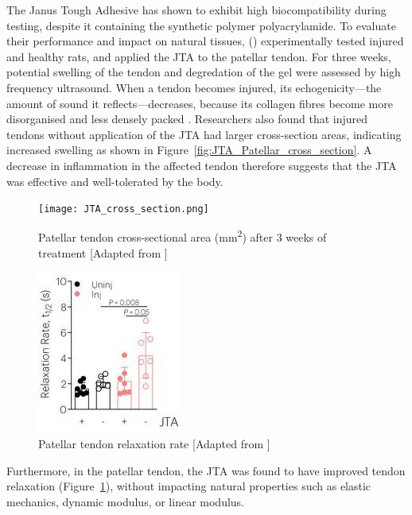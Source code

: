 The Janus Tough Adhesive has shown to exhibit high biocompatibility during testing, despite it containing the synthetic polymer polyacrylamide. To evaluate their performance and impact on natural tissues, \citeauthor{freedmanEnhancedTendonHealing2022} (\citeyear{freedmanEnhancedTendonHealing2022}) experimentally tested  injured and healthy rats, and applied the JTA to the patellar tendon.
For three weeks, potential swelling of the tendon and degredation of the gel were assessed by high frequency ultrasound. When a tendon becomes injured, its echogenicity---the amount of sound it reflects---decreases, because its collagen fibres become more disorganised and less densely packed \autocite{hodgsonTendonLigamentImaging2012}.
Researchers also found that injured tendons without application of the JTA had larger cross-section areas, indicating increased swelling as shown in Figure~\ref{fig:JTA_Patellar_cross_section}. A decrease in inflammation in the affected tendon therefore suggests that the JTA was effective and well-tolerated by the body.
\begin{figure}[ht]
    \centering
    \begin{minipage}[b]{0.45\textwidth}
        \centering
        \texttt{[image: JTA\_cross\_section.png]}
        \caption{Patellar tendon cross-sectional area (mm\textsuperscript{2}) after 3 weeks of treatment [Adapted from \cite{freedmanEnhancedTendonHealing2022}]}
        \label{fig:JTA_Patellar_cross_section}
    \end{minipage}
    \hfill
    \begin{minipage}[b]{0.45\textwidth}
        \centering
        \includegraphics[width=0.6\linewidth]{Figures/JTA_relaxation_patellar.jpeg}
        \caption{Patellar tendon relaxation rate [Adapted from \cite{freedmanEnhancedTendonHealing2022}]}
        \label{fig:JTA_Patellar_relaxation}
    \end{minipage}
\end{figure}

Furthermore, in the patellar tendon, the JTA was found to have improved tendon relaxation (Figure~\ref{fig:JTA_Patellar_relaxation}), without impacting natural properties such as elastic mechanics, dynamic modulus, or linear modulus.

